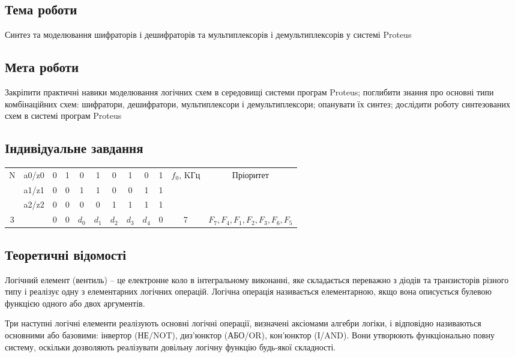 \documentclass[12pt]{extarticle}
\begin{document}
\subsection*{Тема роботи} 
Синтез та моделювання шифраторів і 
дешифраторів та мультиплексорів і демультиплексорів у системі Proteus

\vspace{12pt}

\subsection*{Мета роботи} 
Закріпити практичні навики 
моделювання логічних схем в середовищі системи програм Proteus; поглибити знання про основні типи комбінаційних схем: шифратори, дешифратори, мультиплексори і демультиплексори; опанувати їх синтез; дослідити роботу синтезованих схем в системі програм Proteus

\subsection*{Індивідуальне завдання}
\begin{center}
    \begin{tabular}{| c | c | c | c | c | c | c | c | c | c | c | c |}
    \hline
    \multirow{3}{*}{N} 
    & a0/z0 & 0 & 1 & 0 & 1 & 0 & 1 & 0 & 1 &
    \multirow{3}{*}{$f_0$, KГц} & 
    \multirow{3}{*}{Пріоритет} \\
    \cline{2-10}
    & a1/z1 & 0 & 0 & 1 & 1 & 0 & 0 & 1 & 1 & &\\
    \cline{2-10}
    & a2/z2 & 0 & 0 & 0 & 0 & 1 & 1 & 1 & 1 & &\\
    \hline
    3 &  & 0 & 0 & $d_0$ & $d_1$ & $d_2$ & $d_3$ & $d_4$ & 0 &
    7 &
    $F_7, F_4, F_1, F_2, F_3, F_6, F_5 $ \\
    \hline
    \end{tabular}
\end{center}

\subsection*{Теоретичні відомості}
Логічний елемент (вентиль) – це електронне коло в інтегральному виконанні, 
яке складається переважно з діодів та транзисторів різного типу і реалізує
 одну з елементарних логічних операцій. Логічна операція називається
  елементарною, якщо вона описується булевою функцією одного або двох
   аргументів.
    
Три наступні логічні елементи реалізують основні логічні операції,
 визначені аксіомами алгебри логіки, і відповідно називаються основними 
 або базовими: інвертор (НЕ/NOT), диз’юнктор (АБО/OR), кон’юнктор (І/AND). Вони утворюють функціонально повну систему, оскільки 
  дозволяють реалізувати довільну логічну функцію будь-якої складності.
\end{document}
